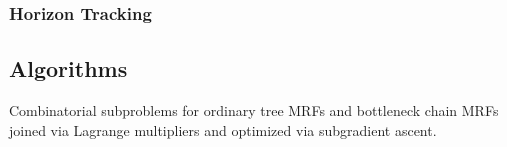 \subsubsection{Horizon Tracking}

\subsection{Algorithms}
\begin{description}[style=unboxed]
\item[Lagrange Decomposition \& Subgradient Ascent~\cite{abbas2019bottleneck}:] Combinatorial subproblems for ordinary tree MRFs and bottleneck chain MRFs joined via Lagrange multipliers and optimized via subgradient ascent.
\end{description}
